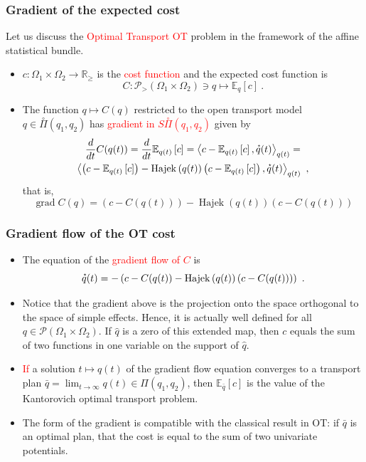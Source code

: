 \documentclass[xcolor=svgnames]{beamer}
\DeclareMathOperator{\Hajek}{Hajek}
\DeclareMathOperator{\Grad}{grad}
\newcommand{\derivby}[1]{\frac{d}{d#1}}
\newcommand{\expectat}[2]{\mathbb E_{#1}\left[#2\right]}
\newcommand{\hajekof}[1]{\Hajek\left(#1\right)}
\newcommand{\openplan}[2]{\overset{\circ}\Pi\left(#1,#2\right)}
\newcommand{\opensimplexon}[1]{\mathcal P_>\left(#1\right)}
\newcommand{\reals}{\mathbb{R}}
\newcommand{\rosso}[1]{\textcolor{red}{#1}}
\newcommand{\scalarat}[3]{\left\langle#2,#3\right\rangle_{#1}}
\newcommand{\simplexon}[1]{\mathcal P\left(#1\right)}
\newcommand{\velocity}[1]{\accentset{\star}{#1}}
\renewcommand{\emph}{\rosso}
\begin{document}
\begin{frame}[plain]\small\frametitle{Gradient of the expected cost}

Let us discuss the \emph{Optimal Transport OT} problem in the framework of the affine statistical bundle.

\begin{itemize}
\item $c \colon \Omega_1 \times \Omega_2 \to \reals_{\ge}$ is the \emph{cost function} and the expected cost function is
\begin{equation*}
  C \colon \opensimplexon {\Omega_1 \times \Omega_2} \ni q \mapsto \expectat q c \ .
\end{equation*}
\item The function $q \mapsto C(q)$ restricted to the open transport model $q \in \openplan{q_1}{q_2}$ has \emph{gradient in $S\openplan{q_1}{q_2}$} given by
\begin{multline*}
\derivby t C(q(t)) = \derivby t \expectat {q(t)} c = \scalarat {q(t)} {c - \expectat {q(t)} c}{\velocity q(t)} = \\
\scalarat {q(t)} {\left(c - \expectat {q(t)} c\right) - \hajekof {q(t)} \left(c - \expectat {q(t)} c\right)}{\velocity q(t)} \ ,
\end{multline*}
that is,
\begin{equation*}
  \Grad C(q) = \left(c - C(q(t))\right) - \hajekof {q(t)} \left(c - C(q(t))\right)
\end{equation*}
\end{itemize}
\end{frame}

\begin{frame}[plain]\small
  \frametitle{Gradient flow of the OT cost}
  \begin{itemize}
  \item The equation of the \emph{gradient flow of $C$} is
\begin{equation*}
  \velocity q(t) = - \left(c - C(q(t)) - \hajekof {q(t)} \left(c - C(q(t))\right)\right) \ .
\end{equation*}

\item Notice that the gradient above is the projection onto the space orthogonal to the space of simple effects. Hence, it is actually well defined for all $q \in \simplexon{\Omega_1 \times \Omega_2}$. If $\hat q$ is a zero of this extended map, then $c$ equals the sum of two functions in one variable on the support of $\hat q$.
\item
  \emph{If} a solution $t \mapsto q(t)$ of the gradient flow equation converges to a transport plan $\bar q = \lim_{t \to \infty} q(t) \in \Pi(q_1,q_2)$, then $\expectat {\bar q} c$ is the value of the Kantorovich optimal transport problem.
\item The form of the gradient is compatible with the classical result in OT: if $\bar q$ is an optimal plan, that the cost is equal to the sum of two univariate potentials. 
\end{itemize}
\end{frame}
\end{document}
